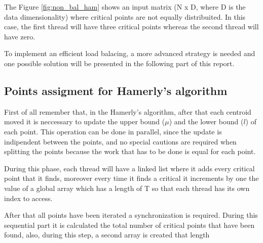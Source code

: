 \documentclass{report}
\begin{document}
\begin{minipage}[b]{0.48\textwidth}
    The Figure \ref{fig:non_bal_ham} shows an input matrix (N x D, where D is the data dimensionality) where critical points are not  equally distribuited. In this case, the first thread will have three critical points whereas the second thread will have zero.

    To implement an efficient load balacing, a more advanced strategy is needed and one possible solution will be presented in the following part of this report. 
    
    \subsection*{Points assigment for Hamerly's algorithm}
    First of all remember that, in the Hamerly's algorithm, after that each centroid moved it is neccessary to update the upper bound ($\mu$) and the lower bound ($l$) of each point. This operation can be done in parallel, since the update is indipendent between the points, and no special cautions are required when splitting the points because the work that has to be done is equal for each point. 

    During this phase, each thread will have a linked list where it adds every critical point that it finds, moreover every time it finds a critical it increments by one the value of a global array which has a length of T so that each thread has its own index to access.

    After that all points have been iterated a synchronization is required. During this sequential part it is calculated the total number of critical points that have been found, also, during this step, a second array is created that length
  \end{minipage}
  \hspace{0.15in}
\end{document}
